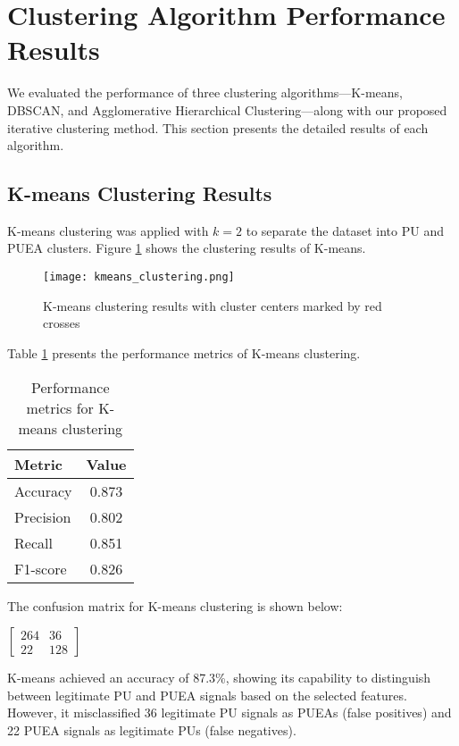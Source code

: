 \section{Clustering Algorithm Performance Results}
We evaluated the performance of three clustering algorithms—K-means, DBSCAN, and Agglomerative Hierarchical Clustering—along with our proposed iterative clustering method. This section presents the detailed results of each algorithm.

\subsection{K-means Clustering Results}
K-means clustering was applied with $k=2$ to separate the dataset into PU and PUEA clusters. Figure \ref{fig:kmeans_clustering} shows the clustering results of K-means.

\begin{figure}[h]
    \centering
    \texttt{[image: kmeans\_clustering.png]}
    \caption{K-means clustering results with cluster centers marked by red crosses}
    \label{fig:kmeans_clustering}
\end{figure}

Table \ref{tab:kmeans_performance} presents the performance metrics of K-means clustering.

\begin{table}[h]
    \centering
    \caption{Performance metrics for K-means clustering}
    \label{tab:kmeans_performance}
    \begin{tabular}{lc}
        \toprule
        Metric & Value \\
        \midrule
        Accuracy & 0.873 \\
        Precision & 0.802 \\
        Recall & 0.851 \\
        F1-score & 0.826 \\
        \bottomrule
    \end{tabular}
\end{table}

The confusion matrix for K-means clustering is shown below:
\begin{center}
$\begin{bmatrix}
264 & 36 \\
22 & 128
\end{bmatrix}$
\end{center}

K-means achieved an accuracy of 87.3\%, showing its capability to distinguish between legitimate PU and PUEA signals based on the selected features. However, it misclassified 36 legitimate PU signals as PUEAs (false positives) and 22 PUEA signals as legitimate PUs (false negatives).

